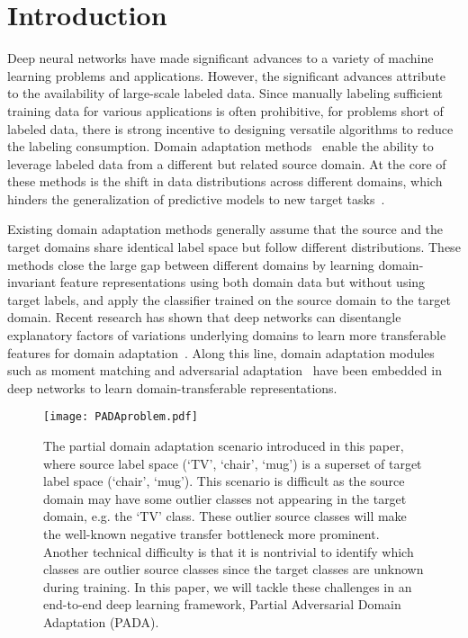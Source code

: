 \documentclass[runningheads]{llncs}
\begin{document}
\section{Introduction}
Deep neural networks have made significant advances to a variety of machine learning problems and applications. However, the significant advances attribute to the availability of large-scale labeled data. Since manually labeling sufficient training data for various applications is often prohibitive, for problems short of labeled data, there is strong incentive to designing versatile algorithms to reduce the labeling consumption. Domain adaptation methods~\cite{cite:TKDE10TLSurvey} enable the ability to leverage labeled data from a different but related source domain. At the core of these methods is the shift in data distributions across different domains, which hinders the generalization of predictive models to new target tasks~\cite{cite:COLT09DAT}.

Existing domain adaptation methods generally assume that the source and the target domains share identical label space but follow different distributions. These methods close the large gap between different domains by learning domain-invariant feature representations using both domain data but without using target labels, and apply the classifier trained on the source domain to the target domain. Recent research has shown that deep networks can disentangle explanatory factors of variations underlying domains to learn more transferable features for domain adaptation~\cite{cite:CVPR13MidLevel,cite:ICML14DeCAF,cite:NIPS14CNN}. Along this line, domain adaptation modules such as moment matching \cite{cite:Arxiv14DDC,cite:ICML15DAN,cite:NIPS16RTN,cite:ICML17JAN} and adversarial adaptation~\cite{cite:ICML15RevGrad,cite:ICCV15SDT,cite:CVPR17ADDA} have been embedded in deep networks to learn domain-transferable representations.

\begin{figure}[tbp]
  \centering
  \texttt{[image: PADAproblem.pdf]}
  \caption{The partial domain adaptation scenario introduced in this paper, where source label space (`TV', `chair', `mug') is a superset of target label space (`chair', `mug'). This scenario is difficult as the source domain may have some outlier classes not appearing in the target domain, e.g. the `TV' class. These outlier source classes will make the well-known negative transfer bottleneck more prominent. Another technical difficulty is that it is nontrivial to identify which classes are outlier source classes since the target classes are unknown during training. In this paper, we will tackle these challenges in an end-to-end deep learning framework, Partial Adversarial Domain Adaptation (PADA).}
   \label{fig:PADAproblem}
\end{figure}
\end{document}
